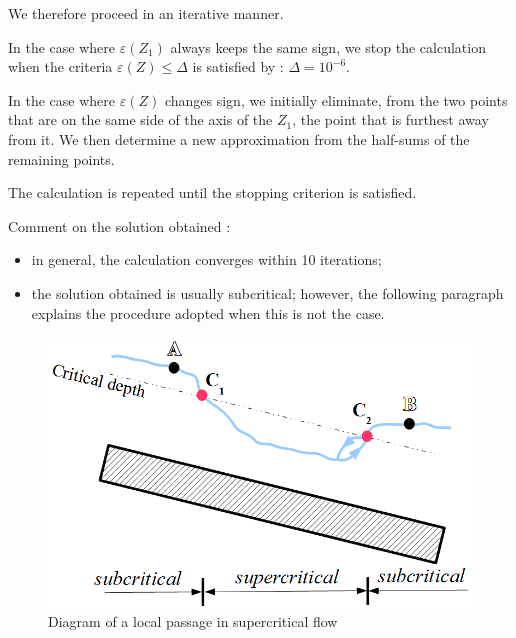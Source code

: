 \vspace{0.5cm}

We therefore proceed in an iterative manner.

\vspace{0.5cm}

In the case where $\varepsilon(Z_1)$ always keeps the same sign, we stop the calculation when the criteria  $\varepsilon(Z) \leq \Delta$ is satisfied by : $\Delta = 10^{-6}$.

\vspace{0.5cm}

In the case where $\varepsilon(Z)$ changes sign, we initially eliminate, from the two points that are on the same side of the axis of the $Z_1$, the point that is furthest away from it.  We then determine a new approximation from the half-sums of the remaining points.

\vspace{0.5cm}

The calculation is repeated until the stopping criterion is satisfied.

\vspace{0.5cm}

Comment on the solution obtained :
\begin{itemize}
 \item in general, the calculation converges within 10 iterations;
 \item the solution obtained is usually subcritical; however, the following paragraph explains the procedure adopted when this is not the case.
\end{itemize}

\begin{figure}
 \begin{center}
  \includegraphics[scale=1.]{Figures/Pass_Loc_Tor.eps}
  \caption{Diagram of a local passage in supercritical flow}
  \label{PLT}
 \end{center}
\end{figure}


